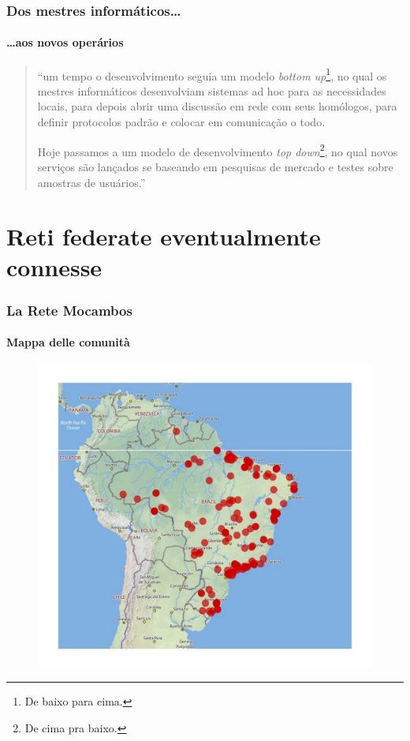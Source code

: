 \documentclass{beamer}
\begin{document}
{\begin{frame}
  \frametitle{Dos mestres informáticos\ldots}
  \framesubtitle{\ldots aos novos operários}
  \begin{quotation}
    ``um tempo o desenvolvimento seguia um modelo \emph{bottom
      up}\footnote{De baixo para cima.}, no qual os mestres
    informáticos desenvolviam sistemas ad hoc para as necessidades
    locais, para depois abrir uma discussão em rede com seus
    homólogos, para definir protocolos padrão e colocar em comunicação
    o todo.

    Hoje passamos a um modelo de desenvolvimento \emph{top
      down}\footnote{De cima pra baixo.}, no qual novos serviços são
    lançados se baseando em pesquisas de mercado e testes sobre
    amostras de usuários.''
  \end{quotation}
\end{frame}


\section{Reti federate eventualmente connesse}

\begin{frame}
  \frametitle{La Rete Mocambos}
  \framesubtitle{Mappa delle comunità}
	\begin{figure}
		\includegraphics[height=0.7\textheight]{./Figuras/MappaRedeMocambos.pdf}
	\end{figure}
\end{frame}

}
\end{document}
